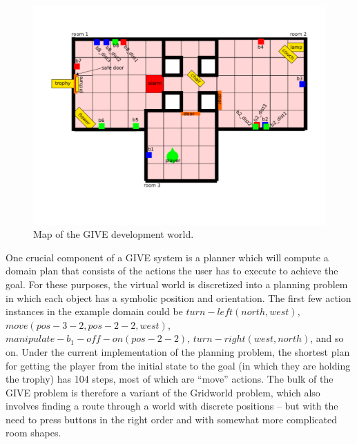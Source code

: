 \begin{figure}
\centering
\includegraphics[width=1 \columnwidth]{give_world_no_expl}
\caption{Map of the GIVE development world.}
  \label{fig:give-development-world}
\end{figure}



One crucial component of a GIVE system is a planner which will compute
a domain plan that consists of the actions the user has to execute to
achieve the goal.  For these purposes, the virtual world is
discretized into a planning problem in which each object has a
symbolic position and orientation.  The first few action instances in
the example domain could be $turn-left(north,west)$, $move(pos-3-2,
pos-2-2, west)$, $manipulate-b_1-off-on(pos-2-2)$,
$turn-right(west,north)$,  and so on.  Under the
current implementation of the planning problem, the shortest plan for
getting the player from the initial state to the goal (in which they
are holding the trophy) has 104 steps, most of which are ``move''
actions.  The bulk of the GIVE problem is therefore a variant of the
Gridworld problem, which also involves finding a route through a world
with discrete positions -- but with the need to press buttons in the
right order and with somewhat more complicated room shapes.

